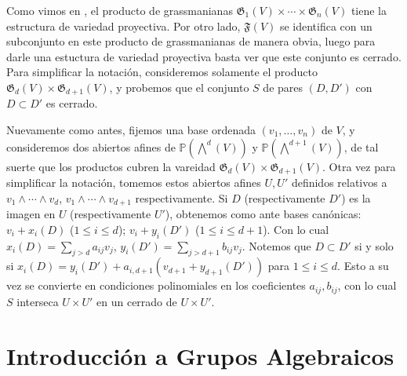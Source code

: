\documentclass[spanish,10pt]{amsart}
\theoremstyle{definition}
\theoremstyle{remark}
\numberwithin{equation}{section}
\begin{document}
Como vimos en \cite[Corolario 2.7.17.]{notas_pedro}, el producto de grassmanianas $\mathfrak G_1 (V) \times \cdots \times \mathfrak G_n (V)$ tiene la estructura de variedad proyectiva. Por otro lado, $\mathfrak F (V)$ se identifica con un subconjunto en este producto de grassmanianas de manera obvia, luego para darle una estuctura de variedad proyectiva basta ver que este conjunto es cerrado. Para simplificar la notación, consideremos solamente el producto $\mathfrak G _d (V) \times \mathfrak G_{d+1} (V)$, y probemos que el conjunto $S$ de pares $(D, D')$ con $D \subset D'$ es cerrado.

Nuevamente como antes, fijemos una base ordenada $(v_1, \ldots, v_n)$ de $V$, y consideremos dos abiertos afines de $\mathbb{P} (\bigwedge^d (V))$ y $\mathbb{P} (\bigwedge^{d+1} (V))$, de tal suerte que los productos cubren la vareidad $\mathfrak G _d (V) \times \mathfrak G _{d+1} (V)$. Otra vez para simplificar la notación, tomemos estos abiertos afines $U, U'$ definidos relativos a $v_1 \wedge \cdots \wedge v_d$, $v_1 \wedge \cdots \wedge v_{d+1}$ respectivamente. Si $D$ (respectivamente $D'$) es la imagen en $U$ (respectivamente $U'$), obtenemos como ante bases canónicas: $v_i + x_i (D)$ ($1 \leq i \leq d$); $v_i + y_i (D')$ ($1\leq i \leq d+ 1$). Con lo cual $x_i (D) = \sum_{j > d} a_{ij} v_j$, $y_i (D') = \sum_{j > d+1} b_{ij} v_j$. Notemos que $D \subset D'$ si y solo si $x_i (D) = y_i (D') + a_{i, d+1} (v_{d+1} + y_{d+1} (D'))$ para $1 \leq i \leq d$. Esto a su vez se convierte en condiciones polinomiales en los coeficientes $a_{ij}, b_{ij}$, con lo cual $S$ interseca $U \times U'$ en un cerrado de $U \times U'$.





















\section{Introducción a Grupos Algebraicos}
\end{document}
